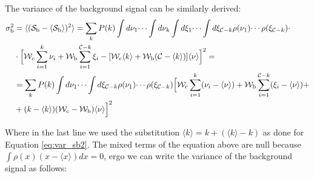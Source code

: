 \documentclass[a4paper, 12pt, twoside, openright]{book}
\newcommand{\C}{\mathcal{C}}
\newcommand{\Wb}{\mathcal{W}_\text{b}}
\newcommand{\Wc}{\mathcal{W}_\text{c}}
\newcommand{\Sb}{\mathcal{S}_\text{b}}
\newcommand{\varSb}{\sigma^{2}_\text{b}}
\begin{document}
The variance of the background signal can be similarly derived:
\begin{equation}
\label{eq:var_sb_cont}
\begin{split}
    \varSb &=\langle(\Sb - \langle \Sb \rangle)^2\rangle = \sum_k P(k) \int d\nu_1  \dotsi \int d\nu_k \int d\xi_1 \dotsi \int d\xi_{\C-k} \rho(\nu_1) \dotsi \rho(\xi_{\C-k}) \cdot \\
    &\cdot \Bigl[ \Wc \sum_{i=1}^{k}\nu_i
    +\Wb \sum_{i=1}^{\C-k} \xi_i 
    - [ \Wc \langle k \rangle 
    +  \Wb (\C - \langle k \rangle) ] \langle \nu \rangle \Bigr]^2 = \\
    &= \sum_k P(k) \int d\nu_1 \dotsi \int d\xi_{\C-k} \rho(\nu_1) \dotsi \rho(\xi_{\C-k})
    \Bigl[ \Wc \sum_{i=1}^k (\nu_i - \langle \nu \rangle) +\Wb \sum_{i=1}^ {\C-k} (\xi_i - \langle \nu \rangle) + \\ 
    & + (k-\langle k \rangle)(\Wc-\Wb)\langle \nu \rangle \Bigr]^2
\end{split}
\end{equation}
    
Where in the last line we used the substitution $\langle k \rangle=k+(\langle k \rangle - k)$ as done for Equation \eqref{eq:var_sb2}.
The mixed terms of the equation above are null because $\int \rho (x) (x-\langle x \rangle)dx = 0$, ergo we can write the variance of the background signal as follows:
\end{document}
